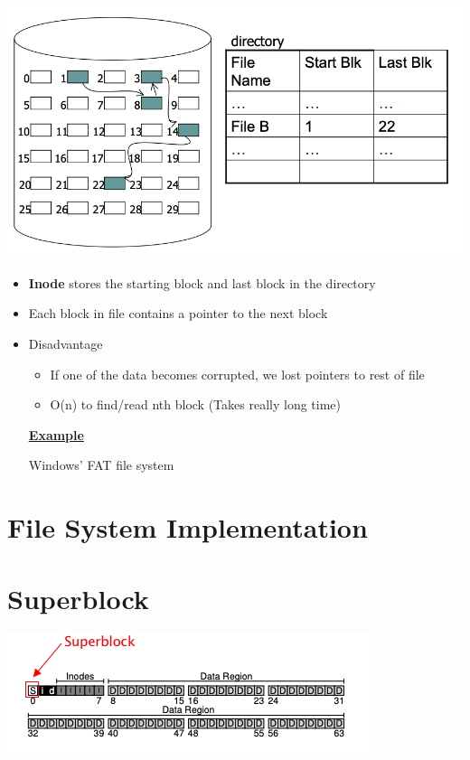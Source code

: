 \documentclass[12pt]{article}
\begin{document}
\begin{center}
\includegraphics[width=\linewidth]{../images/midterm_4_solution_47.png}
\end{center}

\begin{itemize}
    \item \textbf{Inode} stores the starting block and last block in the directory
    \item Each block in file contains a pointer to the next block
    \item Disadvantage
    \begin{itemize}
        \item If one of the data becomes corrupted, we lost pointers to rest of file
        \item O(n) to find/read nth block (Takes really long time)
    \end{itemize}

    \bigskip

    \underline{\textbf{Example}}

    \bigskip

    Windows' FAT file system

    \bigskip
\end{itemize}

\section{File System Implementation}

\section{Superblock}

\begin{center}
\includegraphics[width=\linewidth]{../images/midterm_2_solution_21.png}
\end{center}
\end{document}
